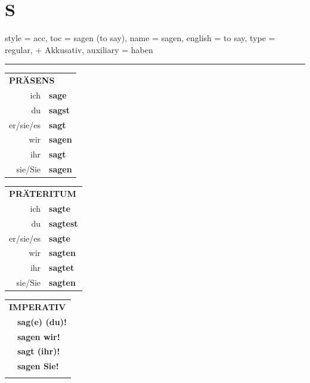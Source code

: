 \section{S}

\begin{verbentry}{
  style = {acc},
  toc = {sagen (to say)},
  name = {sagen},
  english = {to say},
  type = {regular, + Akkusativ},
  auxiliary = {haben}
}
 
    
     \vspace{5pt}

    \hrule
    
    \vspace{5pt}

  \begin{tabular}{rl}
     \multicolumn{2}{l}{\textbf{PRÄSENS} }\\
    ich & \textbf{sage}\\
    du & \textbf{sagst}\\
    er/sie/es & \textbf{sagt}\\
    wir & \textbf{sagen}\\
    ihr & \textbf{sagt}\\
    sie/Sie & \textbf{sagen}\\
  \end{tabular}
  \hfill
     \begin{tabular}{rl}
    \multicolumn{2}{l}{\textbf{PRÄTERITUM} }\\
    ich & \textbf{sagte}\\
    du & \textbf{sagtest}\\
    er/sie/es & \textbf{sagte}\\
    wir & \textbf{sagten}\\
    ihr & \textbf{sagtet}\\
    sie/Sie & \textbf{sagten}\\
  \end{tabular}
  \hfill
  \begin{tabular}{rl}
     \multicolumn{2}{l}{\textbf{IMPERATIV} }\\
   & \textbf{sag(e) (du)!}\\
   & \textbf{sagen wir!}\\
   & \textbf{sagt (ihr)!}\\
   & \textbf{sagen Sie!}\\
   & \vspace{10pt}
  \end{tabular}

    \vspace{10pt}


\end{verbentry}
